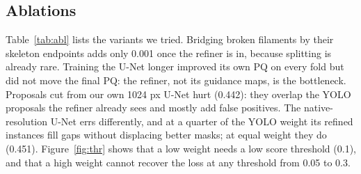 \documentclass[sigconf]{acmart}
\begin{document}
\begin{table}[t]
  \centering
  \caption{Ablations. Top: fold 0 (142 images, settings tuned on fold 0). Bottom: pooled 707-image OOF.}
  \label{tab:abl}
\end{table}

\subsection{Ablations}
    Table~\ref{tab:abl} lists the variants we tried. Bridging broken filaments by their skeleton endpoints
    adds only 0.001 once the refiner is in, because splitting is already rare. Training the U-Net longer
    improved its own PQ on every fold but did not move the final PQ: the refiner, not its guidance maps, is
    the bottleneck. Proposals cut from our own 1024 px U-Net hurt (0.442): they overlap the YOLO proposals the
    refiner already sees and mostly add false positives. The native-resolution U-Net errs differently, and
    at a quarter of the YOLO weight its refined instances fill gaps without displacing better masks; at
    equal weight they do (0.451). Figure~\ref{fig:thr} shows that a low weight needs a low score threshold (0.1), and that a high
    weight cannot recover the loss at any threshold from 0.05 to 0.3.
\end{document}
